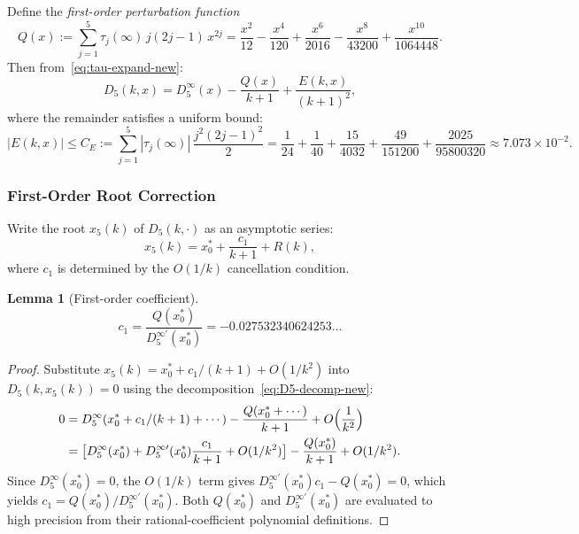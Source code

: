 \documentclass[12pt,a4paper]{article}
\theoremstyle{plain}
\newtheorem{lemma}[theorem]{Lemma}
\theoremstyle{definition}
\begin{document}
Define the \emph{first-order perturbation function}
\begin{equation}\label{eq:Q-def-new}
  Q(x) := \sum_{j=1}^{5} \tau_j(\infty)\,j(2j-1)\,x^{2j}
        = \frac{x^2}{12} - \frac{x^4}{120} + \frac{x^6}{2016}
          - \frac{x^8}{43200} + \frac{x^{10}}{1064448}.
\end{equation}
Then from~\eqref{eq:tau-expand-new}:
\begin{equation}\label{eq:D5-decomp-new}
  D_5(k,x) = D_5^\infty(x) - \frac{Q(x)}{k+1}
            + \frac{E(k,x)}{(k+1)^2},
\end{equation}
where the remainder satisfies a uniform bound:
\begin{equation}\label{eq:E-bound-new}
  |E(k,x)| \le C_E := \sum_{j=1}^{5}
    |\tau_j(\infty)|\,\frac{j^2(2j-1)^2}{2}
    = \frac{1}{24} + \frac{1}{40} + \frac{15}{4032}
      + \frac{49}{151200} + \frac{2025}{95800320}
    \approx 7.073 \times 10^{-2}.
\end{equation}

\subsubsection{First-Order Root Correction}
\label{sec:first-order}

Write the root $x_5(k)$ of $D_5(k,\cdot)$ as an asymptotic series:
\[
  x_5(k) = x_0^* + \frac{c_1}{k+1} + R(k),
\]
where $c_1$ is determined by the $O(1/k)$ cancellation condition.

\begin{lemma}[First-order coefficient]\label{lem:c1-new}
  \begin{equation}\label{eq:c1-new}
    c_1 = \frac{Q(x_0^*)}{D_5^{\infty\prime}(x_0^*)}
        = -0.027532340624253\ldots
  \end{equation}
\end{lemma}

\begin{proof}
  Substitute $x_5(k) = x_0^* + c_1/(k+1) + O(1/k^2)$ into
  $D_5(k, x_5(k)) = 0$ using the decomposition~\eqref{eq:D5-decomp-new}:
  \begin{align*}
    0 &= D_5^\infty(x_0^* + c_1/(k+1) + \cdots)
        - \frac{Q(x_0^* + \cdots)}{k+1}
        + O\Bigl(\frac{1}{k^2}\Bigr) \\
      &= \bigl[D_5^\infty(x_0^*)
          + D_5^{\infty\prime}(x_0^*)\frac{c_1}{k+1} + O(1/k^2)\bigr]
        - \frac{Q(x_0^*)}{k+1} + O(1/k^2).
  \end{align*}
  Since $D_5^\infty(x_0^*) = 0$, the $O(1/k)$ term gives
  $D_5^{\infty\prime}(x_0^*)c_1 - Q(x_0^*) = 0$, which yields
  $c_1 = Q(x_0^*)/D_5^{\infty\prime}(x_0^*)$.
  Both $Q(x_0^*)$ and $D_5^{\infty\prime}(x_0^*)$ are evaluated
  to high precision from their rational-coefficient polynomial
  definitions.
\end{proof}
\end{document}
